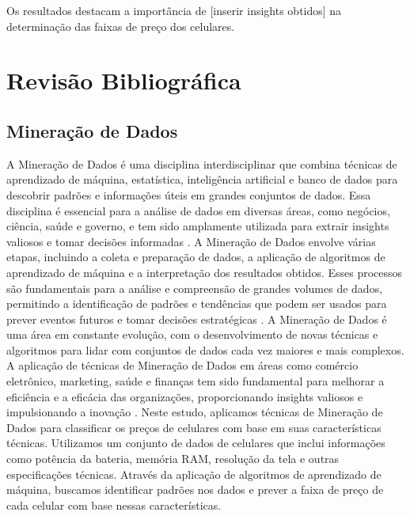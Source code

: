 \documentclass[conference]{IEEEtran}
\begin{document}
Os resultados destacam a importância de [inserir insights obtidos] 
na determinação das faixas de preço dos celulares.


\section{Revisão Bibliográfica}

\subsection{Mineração de Dados}
A Mineração de Dados é uma disciplina interdisciplinar que combina técnicas de
aprendizado de máquina, estatística, inteligência artificial e banco de dados para
descobrir padrões e informações úteis em grandes conjuntos de dados.
Essa disciplina é essencial para a análise de dados em diversas áreas, como
negócios, ciência, saúde e governo, e tem sido amplamente utilizada para
extrair insights valiosos e tomar decisões informadas \cite{Han2011}.
A Mineração de Dados envolve várias etapas, incluindo a coleta e preparação de
dados, a aplicação de algoritmos de aprendizado de máquina e a interpretação dos
resultados obtidos. Esses processos são fundamentais para a análise e
compreensão de grandes volumes de dados, permitindo a identificação de padrões
e tendências que podem ser usados para prever eventos futuros e tomar decisões
estratégicas \cite{Witten2011}.
A Mineração de Dados é uma área em constante evolução, com o desenvolvimento de
novas técnicas e algoritmos para lidar com conjuntos de dados cada vez maiores e
mais complexos. A aplicação de técnicas de Mineração de Dados em áreas como
comércio eletrônico, marketing, saúde e finanças tem sido fundamental para
melhorar a eficiência e a eficácia das organizações, proporcionando insights
valiosos e impulsionando a inovação \cite{Fayyad1996}.
Neste estudo, aplicamos técnicas de Mineração de Dados para classificar os preços
de celulares com base em suas características técnicas. Utilizamos um conjunto de
dados de celulares que inclui informações como potência da bateria, memória RAM,
resolução da tela e outras especificações técnicas. Através da aplicação de
algoritmos de aprendizado de máquina, buscamos identificar padrões nos dados e
prever a faixa de preço de cada celular com base nessas características.
\end{document}
